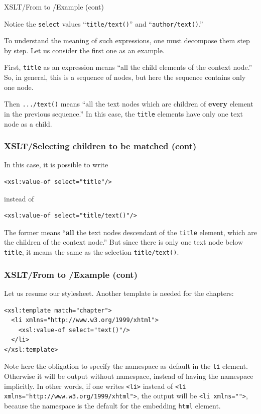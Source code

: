 %
\begin{frame}{XSLT/From \XML to \XHTML{}/Example (cont)}

Notice the \texttt{select} values ``\texttt{title/text()}'' and
``\texttt{author/text()}.''

\bigskip

To understand the meaning of such expressions, one must decompose them
step by step. Let us consider the first one as an example.

\bigskip

First, \texttt{title} as an expression means ``all the child elements
of the context node.'' So, in general, this is a sequence of nodes,
but here the sequence contains only one node.

\bigskip

Then \texttt{.../text()} means ``all the text nodes which are
children of \textbf{every} element in the previous sequence.'' In this
case, the \texttt{title} elements have only one text node as a child.

\end{frame}

%
\begin{frame}[containsverbatim]
\frametitle{XSLT/Selecting children to be matched (cont)}

In this case, it is possible to write
{\small
\begin{verbatim}
<xsl:value-of select="title"/>
\end{verbatim}
}
instead of
{\small
\begin{verbatim}
<xsl:value-of select="title/text()"/>
\end{verbatim}
}
The former means ``\textbf{all} the text nodes descendant of the
\texttt{title} element, which are the children of the context node.''
But since there is only one text node below \texttt{title}, it means
the same as the selection \texttt{title/text()}.

\end{frame}

%
\begin{frame}[containsverbatim]
\frametitle{XSLT/From \XML to \XHTML{}/Example (cont)}

Let us resume our stylesheet. Another template is needed for the
chapters:
{\small
\begin{verbatim}
<xsl:template match="chapter">
  <li xmlns="http://www.w3.org/1999/xhtml">
    <xsl:value-of select="text()"/>
  </li>
</xsl:template>
\end{verbatim}
}
Note here the obligation to specify the \XHTML namespace as default
in the \XHTML \texttt{li} element. Otherwise it will be output without
namespace, instead of having the \XHTML namespace implicitly. In other
words, if one writes \verb|<li>| instead of
\verb|<li xmlns="http://www.w3.org/1999/xhtml">|, the output will be
\verb|<li xmlns="">|, because the \XHTML namespace is the default for
the embedding \texttt{html} element.

\end{frame}

